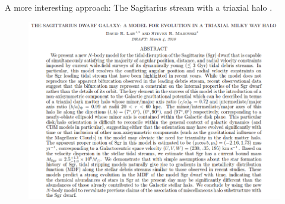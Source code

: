 \documentclass[xcolor=dvipsnames]{beamer}
\begin{document}
\begin{frame}

A more interesting approach: The Sagitarius stream with a triaxial halo \cite[Law \& Majewski 2010]{LawMajewski2010}.

\begin{figure}[c]
\includegraphics[width=0.8\linewidth]{./pics/LM10.png}
\end{figure}

\end{frame}

\end{document}
